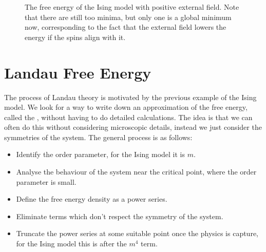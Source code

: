 \documentclass[fleqn]{NotesClass}
\begin{document}
    \begin{figure}
        \caption[Free energy of the Ising model with positive external field.]{The free energy of the Ising model with positive external field. Note that there are still too minima, but only one is a global minimum now, corresponding to the fact that the external field lowers the energy if the spins align with it.}
        \label{fig:landau free energy positive external field}
    \end{figure}
    
    \section{Landau Free Energy}
    The process of Landau theory is motivated by the previous example of the Ising model.
    We look for a way to write down an approximation of the free energy, called the , without having to do detailed calculations.
    The idea is that we can often do this without considering microscopic details, instead we just consider the symmetries of the system.
    The general process is as follows:
    \begin{itemize}
        \item Identify the order parameter, for the Ising model it is \(m\).
        \item Analyse the behaviour of the system near the critical point, where the order parameter is small.
        \item Define the free energy density as a power series.
        \item Eliminate terms which don't respect the symmetry of the system.
        \item Truncate the power series at some suitable point once the physics is capture, for the Ising model this is after the \(m^4\) term.
    \end{itemize}
    
\end{document}
